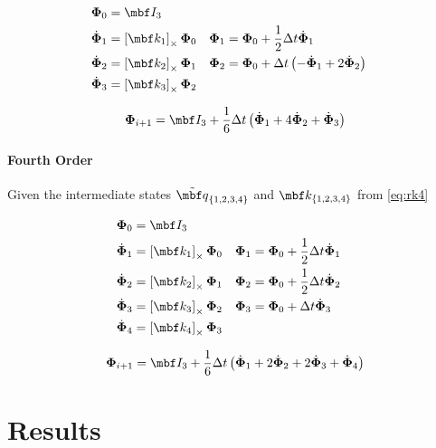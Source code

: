 \documentclass[10pt,a4paper]{article}
\newcommand{\mbs}[1]{{\boldsymbol{#1}}}
\numberwithin{equation}{section}
\begin{document}
\begin{align*}
\mbs \Phi_0 & = \mbf I_3 & \\
\dot{\mbs \Phi}_1 & = \left[\mbf k_1 \right]_\times \mbs \Phi_0 &
	\mbs \Phi_1 & = \mbs \Phi_0 + \dfrac{1}{2} \Delta t \dot{\mbs \Phi}_1 \\
\dot{\mbs \Phi}_2 & = \left[\mbf k_2 \right]_\times \mbs \Phi_1 &
	\mbs \Phi_2 & = \mbs \Phi_0 + \Delta t \left( - \dot{\mbs \Phi}_1 + 2 \dot{\mbs \Phi}_2  \right) \\
\dot{\mbs \Phi}_3 & = \left[\mbf k_3 \right]_\times \mbs \Phi_2
\end{align*}

\begin{equation}
\mbs \Phi_{i+1} = \mbf I_3 + \dfrac{1}{6} \Delta t \left(
	\dot{\mbs \Phi}_1 + 4 \dot{\mbs \Phi}_2 + \dot{\mbs \Phi}_3
\right)
\end{equation}


\paragraph{Fourth Order}

Given the intermediate states $\tilde{\mbf q}_{\lbrace 1, 2, 3, 4 \rbrace}$ and $\mbf k_{\lbrace 1, 2, 3, 4 \rbrace}$ from \eqref{eq:rk4}

\begin{align*}
\mbs \Phi_0 & = \mbf I_3 & \\
\dot{\mbs \Phi}_1 & = \left[\mbf k_1 \right]_\times \mbs \Phi_0 &
	\mbs \Phi_1 & = \mbs \Phi_0 + \dfrac{1}{2} \Delta t \dot{\mbs \Phi}_1 \\
\dot{\mbs \Phi}_2 & = \left[\mbf k_2 \right]_\times \mbs \Phi_1 &
	\mbs \Phi_2 & = \mbs \Phi_0 + \dfrac{1}{2} \Delta t \dot{\mbs \Phi}_2 \\
\dot{\mbs \Phi}_3 & = \left[\mbf k_3 \right]_\times \mbs \Phi_2 &
	\mbs \Phi_3 & = \mbs \Phi_0 + \Delta t \dot{\mbs \Phi}_3  \\
\dot{\mbs \Phi}_4 & = \left[\mbf k_4 \right]_\times \mbs \Phi_3
\end{align*}

\begin{equation}
\mbs \Phi_{i+1} = \mbf I_3 + \dfrac{1}{6} \Delta t \left(
	\dot{\mbs \Phi}_1 + 2 \dot{\mbs \Phi}_2 + 2 \dot{\mbs \Phi}_3 + \dot{\mbs \Phi}_4
\right)
\end{equation}


\section{Results}
\end{document}
